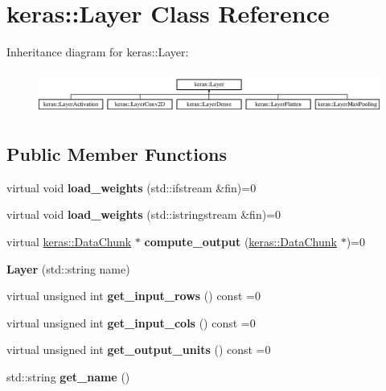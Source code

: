 \hypertarget{classkeras_1_1_layer}{}\section{keras\+:\+:Layer Class Reference}
\label{classkeras_1_1_layer}
Inheritance diagram for keras\+:\+:Layer\+:\begin{figure}[H]
\begin{center}
\leavevmode
\includegraphics[height=1.435897cm]{classkeras_1_1_layer}
\end{center}
\end{figure}
\subsection*{Public Member Functions}
\begin{DoxyCompactItemize}
\item 
\mbox{\label{classkeras_1_1_layer_a591deb80874a90c82fc15e539da01ffd}} 
virtual void {\bfseries load\+\_\+weights} (std\+::ifstream \&fin)=0
\item 
\mbox{\label{classkeras_1_1_layer_a3e8c3fa0693580534f3cb1a904382b57}} 
virtual void {\bfseries load\+\_\+weights} (std\+::istringstream \&fin)=0
\item 
\mbox{\label{classkeras_1_1_layer_a131e3d28719add85c0708f0efecebce8}} 
virtual \mbox{\hyperlink{classkeras_1_1_data_chunk}{keras\+::\+Data\+Chunk}} $\ast$ {\bfseries compute\+\_\+output} (\mbox{\hyperlink{classkeras_1_1_data_chunk}{keras\+::\+Data\+Chunk}} $\ast$)=0
\item 
\mbox{\label{classkeras_1_1_layer_ab4b6918bd08ac5785bb9d946e2876875}} 
{\bfseries Layer} (std\+::string name)
\item 
\mbox{\label{classkeras_1_1_layer_a2379da8d9bbe9108304df98b4f4482f4}} 
virtual unsigned int {\bfseries get\+\_\+input\+\_\+rows} () const =0
\item 
\mbox{\label{classkeras_1_1_layer_a8c4921f448a7fc953e4c3c67a5500e01}} 
virtual unsigned int {\bfseries get\+\_\+input\+\_\+cols} () const =0
\item 
\mbox{\label{classkeras_1_1_layer_a5e7c712bf34917d25ace0ff0e2e15f2b}} 
virtual unsigned int {\bfseries get\+\_\+output\+\_\+units} () const =0
\item 
\mbox{\label{classkeras_1_1_layer_a93467cdf766fb747c300bca9f411900b}} 
std\+::string {\bfseries get\+\_\+name} ()
\end{DoxyCompactItemize}
